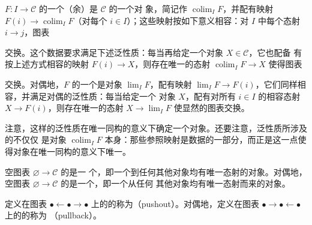 \begin{definition}\label{def:colimit}
\trFunctor{} $F\colon I \to \mathcal{C}$ 的一个（余）\trLimit{}是 $\mathcal{C}$ 的一个对
象，简记作 $\operatorname{colim}_I F$，并配有映射 $F(i) \to \operatorname{colim}_I F$（对每个 $i \in I$）；这些映射按如下意义相容：对 $I$ 中每个态射 $i \to j$，图表
\begin{center}
\end{center}
交换。这个数据要求满足下述泛性质：每当再给定一个对象 $X \in \mathcal{C}$，它也配备
有按上述方式相容的映射 $F(i) \to X$，则存在唯一的态射 $\operatorname{colim}_I F \to X$ 使得图表
\begin{center}
\end{center}
交换。对偶地，$F$ 的一个\trLimit{}是对象 $\operatorname{lim}_I F$，配有映射
$\operatorname{lim}_I F \to F(i)$，它们同样相容，并满足对偶的泛性质：每当给定一个
对象 $X$，配有对所有 $i \in I$ 的相容态射 $X \to F(i)$，则存在唯一的态射
$X \to \operatorname{lim}_I F$ 使显然的图表交换。
\end{definition}

\begin{remark}\label{rem:universal-property-unique-iso}
注意，这样的泛性质在唯一同构的意义下确定一个对象。还要注意，泛性质所涉及的不仅仅
是对象 $\operatorname{colim}_I F$ 本身：那些参照映射是数据的一部分，而正是这一点使
得对象在唯一同构的意义下唯一。
\end{remark}

\begin{example*}
空图表 $\varnothing \to \mathcal{C}$ 的\trColimit{}是一
个\trInitialObject{}，即一个到任何其他对象均有唯一态射的对象。对偶地，空图表
$\varnothing \to \mathcal{C}$ 的\trLimit{}是一个\trTerminalObject{}，即一个从任何
其他对象均有唯一态射而来的对象。
\end{example*}

\begin{example*}
定义在图表 $\bullet \leftarrow \bullet \rightarrow \bullet$
上的\trFunctor{}的\trColimit{}称为\emph{\trPushout{}}（pushout）。对偶地，定义在图表
$\bullet \rightarrow \bullet \leftarrow \bullet$ 上的\trFunctor{}的\trLimit{}称为\emph{\trPullback{}}
（pullback）。
\end{example*}

